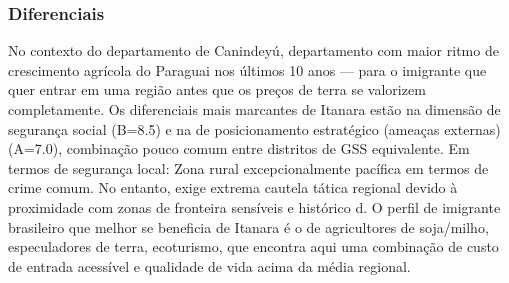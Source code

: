 \subsubsection*{Diferenciais}\label{dif-itanara-1405}
No contexto do departamento de Canindeyú, departamento com maior ritmo de crescimento agrícola do Paraguai nos últimos 10 anos — para o imigrante que quer entrar em uma região antes que os preços de terra se valorizem completamente. Os diferenciais mais marcantes de Itanara estão na dimensão de segurança social (B=8.5) e na de posicionamento estratégico (ameaças externas) (A=7.0), combinação pouco comum entre distritos de GSS equivalente. Em termos de segurança local: Zona rural excepcionalmente pacífica em termos de crime comum. No entanto, exige extrema cautela tática regional devido à proximidade com zonas de fronteira sensíveis e histórico d. O perfil de imigrante brasileiro que melhor se beneficia de Itanara é o de agricultores de soja/milho, especuladores de terra, ecoturismo, que encontra aqui uma combinação de custo de entrada acessível e qualidade de vida acima da média regional.
